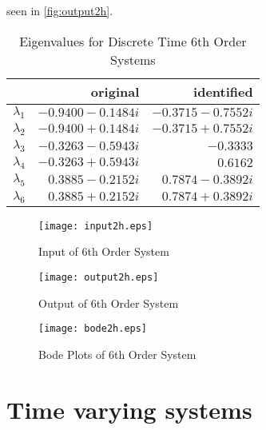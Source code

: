 \documentclass[11pt,a4paper]{article}
\begin{document}
seen in \autoref{fig:output2h}.
\begin{table}
    \centering
    \begin{tabular}{|l|r|r|}
        \hline
        \nonumber & original & identified \\
        \hline
        $ \lambda_1 $ & $ -0.9400 - 0.1484i $ & $ -0.3715 - 0.7552i $ \\
        $ \lambda_2 $ & $ -0.9400 + 0.1484i $ & $ -0.3715 + 0.7552i $ \\
        $ \lambda_3 $ & $ -0.3263 - 0.5943i $ & $ -0.3333 $ \\
        $ \lambda_4 $ & $ -0.3263 + 0.5943i $ & $  0.6162 $ \\
        $ \lambda_5 $ & $ 0.3885 - 0.2152i $ & $ 0.7874 - 0.3892i $ \\
        $ \lambda_6 $ & $ 0.3885 + 0.2152i $ & $ 0.7874 + 0.3892i $ \\
        \hline
    \end{tabular}
    \caption{Eigenvalues for Discrete Time 6th Order Systems}
    \label{tab:sys6deig}
\end{table}
\begin{figure}
    \centering
    \texttt{[image: input2h.eps]}
    \caption{Input of 6th Order System}
    \label{fig:input2h}
\end{figure}
\begin{figure}
    \centering
    \texttt{[image: output2h.eps]}
    \caption{Output of 6th Order System}
    \label{fig:output2h}
\end{figure}
\begin{figure}
    \centering
    \texttt{[image: bode2h.eps]}
    \caption{Bode Plots of 6th Order System}
    \label{fig:bode2h}
\end{figure}

\section{Time varying systems}

\end{document}
